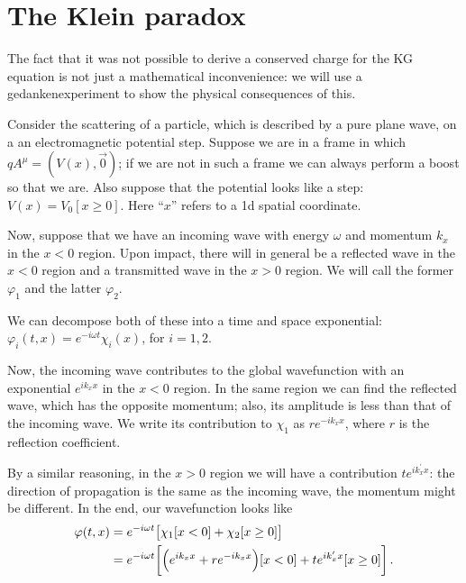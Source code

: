 \documentclass[main.tex]{subfiles}
\begin{document}
\section{The Klein paradox}


The fact that it was not possible to derive a conserved charge for the KG equation is not just a mathematical inconvenience: we will use a gedankenexperiment to show the physical consequences of this. 

Consider the scattering of a particle, which is described by a pure plane wave, on a an electromagnetic potential step.
Suppose we are in a frame in which \(qA^{\mu } = (V(x), \vec{0})\); if we are not in such a frame we can always perform a boost so that we are.
Also suppose that the potential looks like a step: \(V(x) = V_0 [x \geq 0]\). Here ``\(x\)'' refers to a 1d spatial coordinate. 

Now, suppose that we have an incoming wave with energy \(\omega \) and momentum \(k_{x}\) in the \(x<0\) region. 
Upon impact, there will in general be a reflected wave in the \(x<0\) region and a transmitted wave in the \(x>0\) region. We will call the former \(\varphi_{1}\) and the latter \(\varphi_{2}\). 

We can decompose both of these into a time and space exponential: \(\varphi_{i} (t, x) = e^{-i \omega t} \chi_{i}(x)\), for \(i = 1, 2\). 

Now, the incoming wave contributes to the global wavefunction with an exponential \(e^{ik_x x}\) in the \(x<0\) region. 
In the same region we can find the reflected wave, which has the opposite momentum; also, its amplitude is less than that of the incoming wave. We write its contribution to \(\chi_{1}\) as \(r e^{-i k_x x}\), where \(r\) is the reflection coefficient. 

By a similar reasoning, in the \(x>0\) region we will have a contribution \(t e^{i k_x^{\prime } x}\): the direction of propagation is the same as the incoming wave, the momentum might be different. In the end, our wavefunction looks like 
%
\begin{align}
\varphi (t, x) &=
e^{-i \omega t} \qty[\chi_1 [x<0] + \chi_2 [x \geq 0]] \\
&=
 e^{-i \omega t} \qty[ \qty(e^{i k_x x} + r e^{-i k_x x})[x<0] + t e^{i k_x^{\prime }x } [x\geq 0]]
\,.
\end{align}
\end{document}
